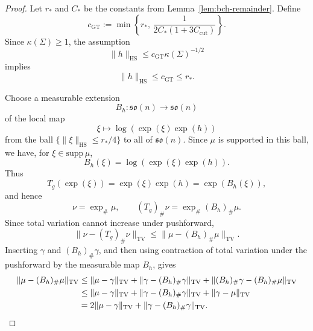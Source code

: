\documentclass[11pt, reqno]{amsart}
\numberwithin{equation}{section}
\theoremstyle{remark}
\newcommand{\1}{\mathbf{1}}
\newcommand{\so}{\mathfrak{so}}
\newcommand{\HS}{\mathrm{HS}}
\newcommand{\TV}{\mathrm{TV}}
\begin{document}
\begin{proof}
Let \(r_\ast\) and \(C_\ast\) be the constants from
Lemma~\ref{lem:bch-remainder}. Define
\[
c_{\mathrm{GT}}
:=
\min\left\{
r_\ast,\,
\frac{1}{2C_\ast(1+3C_{\mathrm{cut}})}
\right\}.
\]
Since \(\kappa(\Sigma)\ge 1\), the assumption
\[
\|h\|_{\HS}\le c_{\mathrm{GT}}\kappa(\Sigma)^{-1/2}
\]
implies
\[
\|h\|_{\HS}\le c_{\mathrm{GT}}\le r_\ast.
\]

Choose a measurable extension
\[
B_h:\so(n)\to\so(n)
\]
of the local map
\[
\xi\mapsto \log(\exp(\xi)\exp(h))
\]
from the ball \(\{\|\xi\|_{\HS}\le r_\ast/4\}\) to all of \(\so(n)\).
Since \(\mu\) is supported in this ball, we have, for \(\xi\in \mathrm{supp}\,\mu\),
\[
B_h(\xi)=\log(\exp(\xi)\exp(h)).
\]
Thus
\[
T_g(\exp(\xi))
=
\exp(\xi)\exp(h)
=
\exp(B_h(\xi)),
\]
and hence
\[
\nu=\exp_\#\mu,
\qquad
(T_g)_\#\nu=\exp_\#(B_h)_\#\mu.
\]
Since total variation cannot increase under pushforward,
\[
\|\nu-(T_g)_\#\nu\|_{\TV}
\le
\|\mu-(B_h)_\#\mu\|_{\TV}.
\]
Inserting \(\gamma\) and \((B_h)_\#\gamma\), and then using contraction of
total variation under the pushforward by the measurable map \(B_h\), gives
\begin{align}
\|\mu-(B_h)_\#\mu\|_{\TV}
&\le
\|\mu-\gamma\|_{\TV}
+
\|\gamma-(B_h)_\#\gamma\|_{\TV}
+
\|(B_h)_\#\gamma-(B_h)_\#\mu\|_{\TV}
\notag\\
&\le
\|\mu-\gamma\|_{\TV}
+
\|\gamma-(B_h)_\#\gamma\|_{\TV}
+
\|\gamma-\mu\|_{\TV}
\notag\\
&=
2\|\mu-\gamma\|_{\TV}
+
\|\gamma-(B_h)_\#\gamma\|_{\TV}.
\label{eq:transfer-triangle}
\end{align}


\end{proof}
\end{document}
